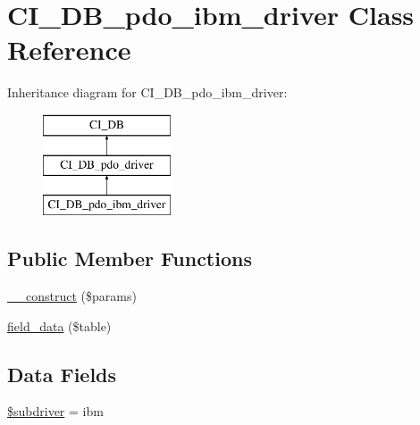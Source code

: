 \hypertarget{class_c_i___d_b__pdo__ibm__driver}{}\section{C\+I\+\_\+\+D\+B\+\_\+pdo\+\_\+ibm\+\_\+driver Class Reference}
\label{class_c_i___d_b__pdo__ibm__driver}
Inheritance diagram for C\+I\+\_\+\+D\+B\+\_\+pdo\+\_\+ibm\+\_\+driver\+:\begin{figure}[H]
\begin{center}
\leavevmode
\includegraphics[height=3.000000cm]{class_c_i___d_b__pdo__ibm__driver}
\end{center}
\end{figure}
\subsection*{Public Member Functions}
\begin{DoxyCompactItemize}
\item 
\mbox{\hyperlink{class_c_i___d_b__pdo__ibm__driver_a9162320adff1a1a4afd7f2372f753a3e}{\+\_\+\+\_\+construct}} (\$params)
\item 
\mbox{\hyperlink{class_c_i___d_b__pdo__ibm__driver_a90355121e1ed009e0efdbd544ab56efa}{field\+\_\+data}} (\$table)
\end{DoxyCompactItemize}
\subsection*{Data Fields}
\begin{DoxyCompactItemize}
\item 
\mbox{\hyperlink{class_c_i___d_b__pdo__ibm__driver_a1322ca756348b11d080cb7a4f590de15}{\$subdriver}} = \textquotesingle{}ibm\textquotesingle{}
\end{DoxyCompactItemize}
